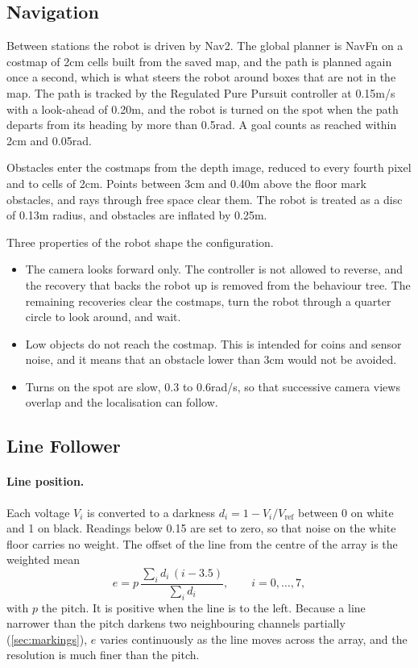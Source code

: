 \subsection{Navigation}
\label{sec:navigation}
Between stations the robot is driven by Nav2. The global planner is NavFn on a costmap of
2\unit{cm} cells built from the saved map, and the path is planned again once a second,
which is what steers the robot around boxes that are not in the map. The path is tracked by
the Regulated Pure Pursuit controller at 0.15\unit{m/s} with a look-ahead of 0.20\unit{m},
and the robot is turned on the spot when the path departs from its heading by more than
0.5\unit{rad}. A goal counts as reached within 2\unit{cm} and 0.05\unit{rad}.

Obstacles enter the costmaps from the depth image, reduced to every fourth pixel and to
cells of 2\unit{cm}. Points between 3\unit{cm} and 0.40\unit{m} above the floor mark
obstacles, and rays through free space clear them. The robot is treated as a disc of
0.13\unit{m} radius, and obstacles are inflated by 0.25\unit{m}.

Three properties of the robot shape the configuration.
\begin{itemize}
  \item The camera looks forward only. The controller is not allowed to reverse, and the
        recovery that backs the robot up is removed from the behaviour tree. The remaining
        recoveries clear the costmaps, turn the robot through a quarter circle to look
        around, and wait.
  \item Low objects do not reach the costmap. This is intended for coins and sensor noise,
        and it means that an obstacle lower than 3\unit{cm} would not be avoided.
  \item Turns on the spot are slow, 0.3 to 0.6\unit{rad/s}, so that successive camera views
        overlap and the localisation can follow.
\end{itemize}

\subsection{Line Follower}
\label{sec:linefollower}
\paragraph{Line position.} Each voltage $V_i$ is converted to a darkness
$d_i=1-V_i/V_{\mathrm{ref}}$ between 0 on white and 1 on black. Readings below 0.15 are set
to zero, so that noise on the white floor carries no weight. The offset of the line from the
centre of the array is the weighted mean
\begin{equation}
  e = p\,\frac{\sum_i d_i\,(i-3.5)}{\sum_i d_i}, \qquad i=0,\dots,7,
  \label{eq:offset}
\end{equation}
with $p$ the pitch. It is positive when the line is to the left. Because a line narrower
than the pitch darkens two neighbouring channels partially (\cref{sec:markings}), $e$ varies
continuously as the line moves across the array, and the resolution is much finer than the
pitch.

